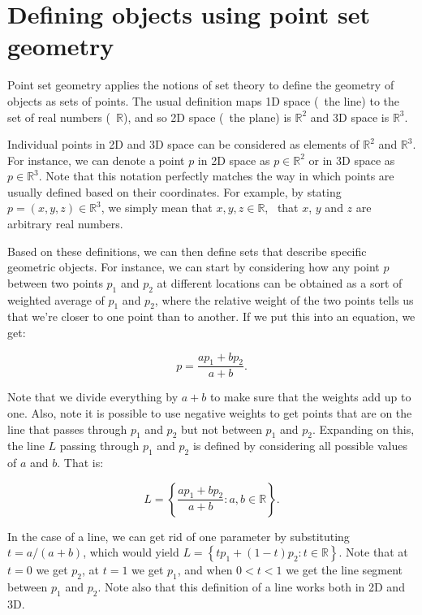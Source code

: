 \section{Defining objects using point set geometry}%
\label{sec:ps}

Point set geometry applies the notions of set theory to define the geometry of objects as sets of points.
The usual definition maps 1D space (\ie\ the line) to the set of real numbers (\ie\ \(\mathbb{R}\)), and so 2D space (\ie\ the plane) is \(\mathbb{R}^2\) and 3D space is \(\mathbb{R}^3\).

Individual points in 2D and 3D space can be considered as elements of \(\mathbb{R}^2\) and \(\mathbb{R}^3\).
For instance, we can denote a point \(p\) in 2D space as \(p \in \mathbb{R}^2\) or in 3D space as \(p \in \mathbb{R}^3\).
Note that this notation perfectly matches the way in which points are usually defined based on their coordinates.
For example, by stating \(p = (x, y, z) \in \mathbb{R}^3\), we simply mean that \(x,y,z \in \mathbb{R} \), \ie\ that \(x\), \(y\) and \(z\) are arbitrary real numbers.

Based on these definitions, we can then define sets that describe specific geometric objects.
For instance, we can start by considering how any point \(p\) between two points \(p_1\) and \(p_2\) at different locations can be obtained as a sort of weighted average of \(p_1\) and \(p_2\), where the relative weight of the two points tells us that we're closer to one point than to another.
If we put this into an equation, we get:

\begin{equation}
p = \frac{a p_1 + b p_2}{a+b}.
\end{equation}

Note that we divide everything by \(a+b\) to make sure that the weights add up to one.
Also, note it is possible to use negative weights to get points that are on the line that passes through \(p_1\) and \(p_2\) but not between \(p_1\) and \(p_2\).
Expanding on this, the line \(L\) passing through \(p_1\) and \(p_2\) is defined by considering all possible values of \(a\) and \(b\).
That is:

\begin{equation}
\label{eq:line}
L = \left\{ \frac{a p_1 + b p_2}{a+b} : a,b \in \mathbb{R} \right\}.
\end{equation}

In the case of a line, we can get rid of one parameter by substituting \(t = a/(a+b)\), which would yield \(L = \left\{ t p_1 + (1-t) p_2 : t \in \mathbb{R} \right\} \).
Note that at \(t = 0\) we get \(p_2\), at \(t = 1\) we get \(p_1\), and when \(0 < t < 1\) we get the line segment between \(p_1\) and \(p_2\).
Note also that this definition of a line works both in 2D and 3D.

